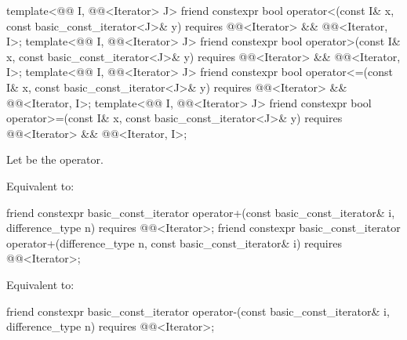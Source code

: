 %
%
%
%
\begin{itemdecl}
template<@@ I, @@<Iterator> J>
  friend constexpr bool operator<(const I& x, const basic_const_iterator<J>& y)
    requires @@<Iterator> && @@<Iterator, I>;
template<@@ I, @@<Iterator> J>
  friend constexpr bool operator>(const I& x, const basic_const_iterator<J>& y)
    requires @@<Iterator> && @@<Iterator, I>;
template<@@ I, @@<Iterator> J>
  friend constexpr bool operator<=(const I& x, const basic_const_iterator<J>& y)
    requires @@<Iterator> && @@<Iterator, I>;
template<@@ I, @@<Iterator> J>
  friend constexpr bool operator>=(const I& x, const basic_const_iterator<J>& y)
    requires @@<Iterator> && @@<Iterator, I>;
\end{itemdecl}

\begin{itemdescr}
\pnum
Let  be the operator.

\pnum
\effects
Equivalent to: 
\end{itemdescr}

%
\begin{itemdecl}
friend constexpr basic_const_iterator operator+(const basic_const_iterator& i, difference_type n)
  requires @@<Iterator>;
friend constexpr basic_const_iterator operator+(difference_type n, const basic_const_iterator& i)
  requires @@<Iterator>;
\end{itemdecl}

\begin{itemdescr}
\pnum
\effects
Equivalent to: 
\end{itemdescr}

%
\begin{itemdecl}
friend constexpr basic_const_iterator operator-(const basic_const_iterator& i, difference_type n)
  requires @@<Iterator>;
\end{itemdecl}

